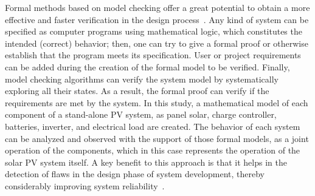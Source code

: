 \documentclass[journal]{IEEEtran}
\begin{document}
Formal methods based on model checking offer a great potential to obtain a more effective and faster verification in the design process~\cite{ClarkeHV18}.  
Any kind of system can be specified as computer programs using mathematical logic, which constitutes the intended (correct) behavior; then, one can try to give a formal proof or otherwise establish that the program meets its specification. User or project requirements can be added during the creation of the formal model to be verified. %
%
%
Finally, model checking algorithms can verify the system model by systematically exploring all their states. As a result, the formal proof can verify if the requirements are met by the system.
%
%
In this study, a mathematical model of each component of a stand-alone PV system, as panel solar, charge controller, batteries, inverter, and electrical load are created. The behavior of each system can be analyzed and observed with the support of those formal models, as a joint operation of the components, which in this case represents the operation of the solar PV system itself. A key benefit to this approach is that it helps in the detection of flaws in the design phase of system development, thereby considerably improving system reliability~\cite{Akram2018}.
\end{document}
